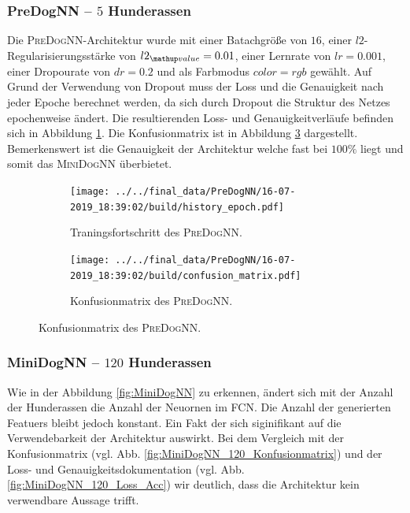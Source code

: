 \subsubsection{PreDogNN -- $5$ Hunderassen}
Die \textsc{PreDogNN}-Architektur wurde mit einer Batachgröße von $16$, einer
$l2$-Regularisierungsstärke von $l2\ua{value}=0.01$, einer Lernrate von
$lr=0.001$, einer Dropourate von $dr=0.2$ und als Farbmodus $color=rgb$ gewählt.
Auf Grund der Verwendung von Dropout muss der Loss und die Genauigkeit nach jeder
Epoche berechnet werden, da sich durch Dropout die Struktur des Netzes epochenweise
ändert. Die resultierenden Loss- und Genauigkeitverläufe befinden sich in Abbildung
\ref{fig:PreDogNN_Loss_Acc}. Die Konfusionmatrix ist in Abbildung \ref{fig:PreDogNN_Konfusionmatrix}
dargestellt. Bemerkenswert ist die Genauigkeit der Architektur welche fast
 bei $100\%$ liegt und somit das \textsc{MiniDogNN} überbietet.
\begin{figure}
\centering
\begin{subfigure}{0.48\textwidth}
\centering
\texttt{[image: ../../final\_data/PreDogNN/16-07-2019\_18:39:02/build/history\_epoch.pdf]}
\caption{Traningsfortschritt des \textsc{PreDogNN}.}
\label{fig:PreDogNN_Loss_Acc}
\end{subfigure}
\begin{subfigure}{0.48\textwidth}
\centering
\texttt{[image: ../../final\_data/PreDogNN/16-07-2019\_18:39:02/build/confusion\_matrix.pdf]}
\caption{Konfusionmatrix des \textsc{PreDogNN}.}
\label{fig:PreDogNN_Konfusionmatrix}
\end{subfigure}
\end{figure}

\subsubsection{MiniDogNN -- $120$ Hunderassen}
Wie in der Abbildung \ref{fig:MiniDogNN} zu erkennen, ändert sich mit der
Anzahl der Hunderassen die Anzahl der Neuornen im FCN. Die Anzahl der generierten
Featuers bleibt jedoch konstant. Ein Fakt der sich siginifikant auf die
Verwendebarkeit der Architektur auswirkt. Bei dem Vergleich mit der Konfusionmatrix
(vgl. Abb. \ref{fig:MiniDogNN_120_Konfusionmatrix}) und
der Loss- und Genauigkeitsdokumentation (vgl. Abb. \ref{fig:MiniDogNN_120_Loss_Acc})
wir deutlich, dass die Architektur kein verwendbare Aussage trifft.

